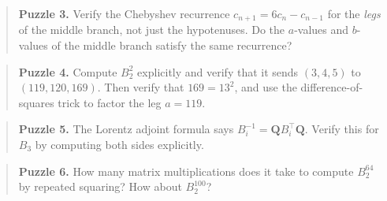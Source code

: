 \begin{quote}
\textbf{Puzzle 3.} Verify the Chebyshev recurrence $c_{n+1} = 6c_n - c_{n-1}$ for the \textit{legs} of the middle branch, not just the hypotenuses. Do the $a$-values and $b$-values of the middle branch satisfy the same recurrence?
\end{quote}

\begin{quote}
\textbf{Puzzle 4.} Compute $B_2^2$ explicitly and verify that it sends $(3, 4, 5)$ to $(119, 120, 169)$. Then verify that $169 = 13^2$, and use the difference-of-squares trick to factor the leg $a = 119$.
\end{quote}

\begin{quote}
\textbf{Puzzle 5.} The Lorentz adjoint formula says $B_i^{-1} = \mathbf{Q} B_i^\top \mathbf{Q}$. Verify this for $B_3$ by computing both sides explicitly.
\end{quote}

\begin{quote}
\textbf{Puzzle 6.} How many matrix multiplications does it take to compute $B_2^{64}$ by repeated squaring? How about $B_2^{100}$?
\end{quote}


